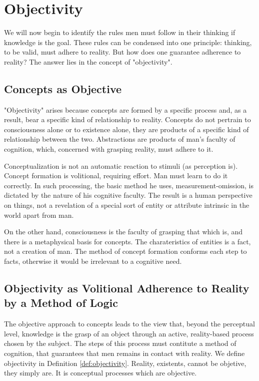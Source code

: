 \chapter{Objectivity}

    We will now begin to identify the rules men must follow in their thinking if knowledge is the goal. These rules can be condensed into one principle: thinking, to be valid, must adhere to reality. But how does one guarantee adherence to reality? The answer lies in the concept of "objectivity".

    \section{Concepts as Objective}

        "Objectivity" arises because concepts are formed by a specific process and, as a result, bear a specific kind of relationship to reality. Concepts do not pertrain to consciousness alone or to existence alone, they are products of a specific kind of relationship between the two. Abstractions are products of man's faculty of cognition, which, concerned with grasping reality, must adhere to it.

        Conceptualization is not an automatic reaction to stimuli (as perception is). Concept formation is volitional, requiring effort. Man must learn to do it correctly. In such processing, the basic method he uses, measurement-omission, is dictated by the nature of his cognitive faculty. The result is a human perspective on things, not a revelation of a special sort of entity or attribute intrinsic in the world apart from man.

        On the other hand, consciousness is the faculty of grasping that which is, and there is a metaphysical basis for concepts. The charateristics of entities is a fact, not a creation of man. The method of concept formation conforms each step to facts, otherwise it would be irrelevant to a cognitive need.

    \section{Objectivity as Volitional Adherence to Reality by a Method of Logic}

        The objective approach to concepts leads to the view that, beyond the perceptual level, knowledge is the grasp of an object through an active, reality-based process chosen by the subject. The steps of this process must contitute a method of cognition, that guarantees that men remains in contact with reality. We define objectivity in Definition \ref{def:objectivity}. Reality, existents, cannot be objetive, they simply are. It is conceptual processes which are objective.

